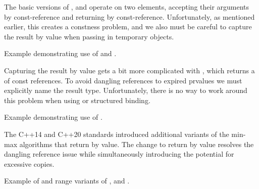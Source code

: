 The basic versions of ,  and  operate on two elements, accepting their arguments by const-reference and returning by const-reference. Unfortunately, as mentioned earlier, this creates a constness problem, and we also must be careful to capture the result by value when passing in temporary objects.


\begin{codebox}[]{\href{https://compiler-explorer.com/z/5GKe13fd5}{\ExternalLink}}
\footnotesize Example demonstrating use of  and .
\tcblower
{}
\end{codebox}

Capturing the result by value gets a bit more complicated with , which returns a  of const references. To avoid dangling references to expired prvalues we must explicitly name the result type. Unfortunately, there is no way to work around this problem when using  or structured binding.

\begin{codebox}[breakable]{\href{https://compiler-explorer.com/z/WGahheGfT}{\ExternalLink}}
\footnotesize Example demonstrating use of .
\tcblower
{}
\end{codebox}

The C++14 and C++20 standards introduced additional variants of the min-max algorithms that return by value. The change to return by value resolves the dangling reference issue while simultaneously introducing the potential for excessive copies.


\begin{codebox}[]{\href{https://compiler-explorer.com/z/P4r5ze416}{\ExternalLink}}
\footnotesize Example of  and range variants of ,  and .
\tcblower
{}
\end{codebox}

\subsection{\texorpdfstring{}{\texttt{std::clamp}}}

